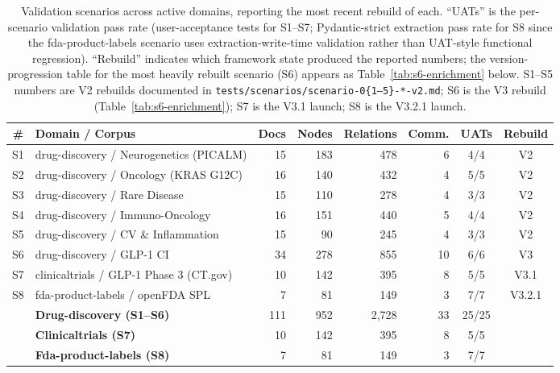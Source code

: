 \begin{table}[t]
\centering
\small
\caption{Validation scenarios across active domains, reporting the most recent rebuild of each. ``UATs'' is the per-scenario validation pass rate (user-acceptance tests for S1--S7; Pydantic-strict extraction pass rate for S8 since the fda-product-labels scenario uses extraction-write-time validation rather than UAT-style functional regression). ``Rebuild'' indicates which framework state produced the reported numbers; the version-progression table for the most heavily rebuilt scenario (S6) appears as Table~\ref{tab:s6-enrichment} below. S1--S5 numbers are V2 rebuilds documented in \texttt{tests/scenarios/scenario-0\{1--5\}-*-v2.md}; S6 is the V3 rebuild (Table~\ref{tab:s6-enrichment}); S7 is the V3.1 launch; S8 is the V3.2.1 launch.}
\label{tab:scenarios}
\begin{tabular}{@{}clrrrrcc@{}}
\toprule
\textbf{\#} & \textbf{Domain / Corpus} & \textbf{Docs} & \textbf{Nodes} & \textbf{Relations} & \textbf{Comm.} & \textbf{UATs} & \textbf{Rebuild} \\
\midrule
S1 & drug-discovery / Neurogenetics (PICALM)        & 15 & 183 & 478 & 6  & 4/4 & V2 \\
S2 & drug-discovery / Oncology (KRAS G12C)          & 16 & 140 & 432 & 4  & 5/5 & V2 \\
S3 & drug-discovery / Rare Disease                  & 15 & 110 & 278 & 4  & 3/3 & V2 \\
S4 & drug-discovery / Immuno-Oncology               & 16 & 151 & 440 & 5  & 4/4 & V2 \\
S5 & drug-discovery / CV \& Inflammation            & 15 &  90 & 245 & 4  & 3/3 & V2 \\
S6 & drug-discovery / GLP-1 CI                      & 34 & 278 & 855 & 10 & 6/6 & V3 \\
S7 & clinicaltrials / GLP-1 Phase 3 (CT.gov)         & 10 & 142 & 395 & 8  & 5/5 & V3.1 \\
S8 & fda-product-labels / openFDA SPL                & 7  &  81 & 149 & 3  & 7/7 & V3.2.1 \\
\midrule
   & \textbf{Drug-discovery (S1--S6)}               & 111 & 952 & 2{,}728 & 33 & 25/25 &        \\
   & \textbf{Clinicaltrials (S7)}                   & 10  & 142 & 395     & 8  & 5/5   &        \\
   & \textbf{Fda-product-labels (S8)}               & 7   &  81 & 149     & 3  & 7/7   &        \\
\bottomrule
\end{tabular}
\end{table}


